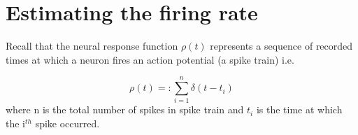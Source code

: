 
\section{Estimating the firing rate}
Recall that the neural response function $\rho(t)$ represents a sequence of recorded times
at which a neuron fires an action potential (a spike train) i.e.

\begin{equation}\label{response function}
 \rho(t) =: \sum_{i=1}^{n} \delta(t-t_{i})  
\end{equation}
where n is the total number of spikes in spike train and $t_{i}$ is the time at which the i$^{th}$ spike occurred.